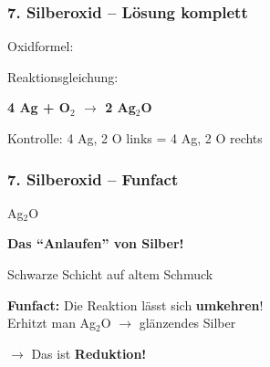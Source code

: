 \documentclass[aspectratio=169, 12pt]{beamer}
\newcommand{\lsg}[1]{\textcolor{loesung}{\textbf{#1}}}
\begin{document}
\begin{frame}
\frametitle{7. Silberoxid – Lösung komplett}
\begin{center}
\vspace{0.5cm}
{\large Oxidformel:} \quad {\Huge \lsg{Ag$_2$O}}
\vspace{1cm}

{\large Reaktionsgleichung:}
\vspace{0.5cm}

{\Huge \lsg{4 Ag + O$_2$ $\rightarrow$ 2 Ag$_2$O}}
\vspace{0.5cm}

{\small Kontrolle: 4 Ag, 2 O links = 4 Ag, 2 O rechts \checkmark}
\end{center}
\end{frame}

\begin{frame}
\frametitle{7. Silberoxid – Funfact}
\begin{center}
\vspace{0.3cm}
{\Huge \textcolor{chemie}{Ag$_2$O}}
\vspace{0.6cm}

{\Large\textbf{Das ``Anlaufen'' von Silber!}}
\vspace{0.4cm}

Schwarze Schicht auf altem Schmuck
\vspace{0.6cm}

\textcolor{akzent}{\textbf{Funfact:}} Die Reaktion lässt sich \textbf{umkehren}!\\
Erhitzt man Ag$_2$O $\rightarrow$ glänzendes Silber
\vspace{0.4cm}

{\Large $\rightarrow$ Das ist \textbf{Reduktion!}}
\end{center}
\end{frame}

\end{document}
